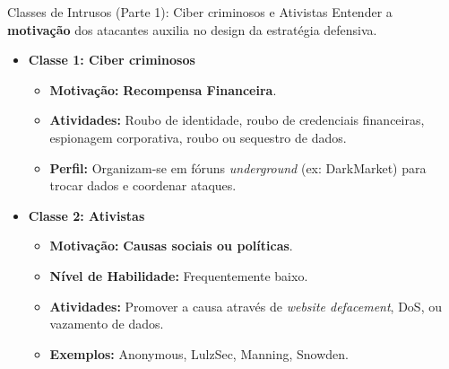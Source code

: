 \begin{frame}{Classes de Intrusos (Parte 1): Ciber criminosos e Ativistas}
    Entender a \textbf{motivação} dos atacantes auxilia no design da estratégia defensiva.
    \begin{itemize}


        \item \textbf{Classe 1: Ciber criminosos}
              \begin{itemize}
                  \item \textbf{Motivação:} \textbf{Recompensa Financeira}.
                  \item \textbf{Atividades:} Roubo de identidade, roubo de credenciais financeiras, espionagem corporativa, roubo ou sequestro de dados.
                  \item \textbf{Perfil:} Organizam-se em fóruns \textit{underground} (ex: DarkMarket) para trocar dados e coordenar ataques.
              \end{itemize}

        \item \textbf{Classe 2: Ativistas}
              \begin{itemize}
                  \item \textbf{Motivação:} \textbf{Causas sociais ou políticas}.
                  \item \textbf{Nível de Habilidade:} Frequentemente baixo.
                  \item \textbf{Atividades:} Promover a causa através de \textit{website defacement}, DoS, ou vazamento de dados.
                  \item \textbf{Exemplos:} Anonymous, LulzSec, Manning, Snowden.
              \end{itemize}
    \end{itemize}
\end{frame}

